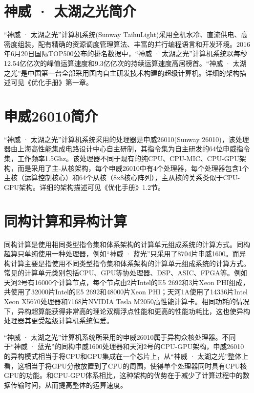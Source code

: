 \section*{神威 · 太湖之光简介}
“神威 · 太湖之光”计算机系统(Sunway TaihuLight)采用全机水冷、直流供电、高密度组装，配有精确的资源调度管理算法、丰富的并行编程语言和开发环境。2016年6月20日国际TOP500公布的排名数据中，“神威 · 太湖之光”计算机系统以每秒12.54亿亿次的峰值运算速度和9.3亿亿次的持续运算速度高居榜首。“神威 · 太湖之光”是中国第一台全部采用国内自主研发技术构建的超级计算机。详细的架构描述可见《优化手册》第一章。

\section*{申威26010简介}
“神威 · 太湖之光”计算机系统采用的处理器是申威26010(Sunway 26010)，该处理器由上海高性能集成电路设计中心自主研制，其指令集为自主研发的64位申威指令集，工作频率1.5Ghz。该处理器不同于现有的纯CPU、CPU-MIC、CPU-GPU架构，而是采用了主-从核架构，每个申威26010中有4个处理器，每个处理器包含1个主核（运算控制核心）和64个从核（8x8核心阵列），主从核的关系类似于CPU-GPU架构。详细的架构描述可见《优化手册》1.2节。

\section*{同构计算和异构计算\cite{noauthor__nodate}}
同构计算是使用相同类型指令集和体系架构的计算单元组成系统的计算方式。同构超算只单纯使用一种处理器，例如“神威 · 蓝光”只采用了8704片申威1600。而异构计算主要是指使用不同类型指令集和体系架构的计算单元组成系统的计算方式。常见的计算单元类别包括CPU、GPU等协处理器、DSP、ASIC、FPGA等。例如天河2号有16000个计算节点，每个节点由2片Intel的E5 2692和3片Xeon PHI组成，共使用了32000片Intel的E5 2692和48000片Xeon PHI；天河1A使用了14336片Intel Xeon X5670处理器和7168片NVIDIA Tesla M2050高性能计算卡。相同功耗的情况下，异构超算能获得非常高的理论双精浮点性能和更高的性能功耗比，这也使异构处理器其更受超级计算机系统偏爱。

“神威 · 太湖之光”计算机系统所采用的申威26010属于异构众核处理器。不同于“神威 · 蓝光”的同构申威1600处理器和天河2号的CPU-GPU架构，申威26010的异构模式相当于将CPU和GPU集成在一个芯片上，从“神威 · 太湖之光”整体上看，这相当于将GPU分散放置到了CPU的周围，使得单个处理器同时具有CPU核GPU的功能。和CPU-GPU体系相比，这种架构的优势在于减少了计算过程中的数据传输时间，从而提高整体的运算速度。



